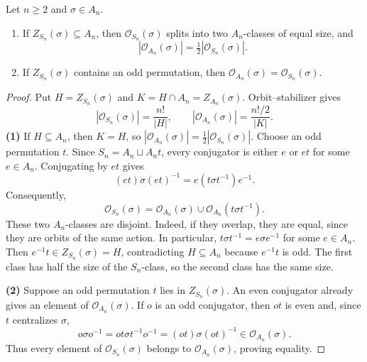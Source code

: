 \documentclass[reqno,11pt]{amsart}
\begin{document}
\begin{proposition}\label{prop:splitting}
Let $n\geq2$ and $\sigma\in A_n$.
\begin{enumerate}[label=\textbf{(\arabic*)}]
  \item If $Z_{S_n}(\sigma)\subseteq A_n$, then
  $\mathcal{O}_{S_n}(\sigma)$ splits into two $A_n$-classes of equal size, and
  \[
    |\mathcal{O}_{A_n}(\sigma)|=\tfrac12|\mathcal{O}_{S_n}(\sigma)|.
  \]
  \item If $Z_{S_n}(\sigma)$ contains an odd permutation, then
  $\mathcal{O}_{A_n}(\sigma)=\mathcal{O}_{S_n}(\sigma)$.
\end{enumerate}
\end{proposition}
\begin{proof}
Put $H=Z_{S_n}(\sigma)$ and $K=H\cap A_n=Z_{A_n}(\sigma)$.
Orbit--stabilizer gives
\[
  |\mathcal{O}_{S_n}(\sigma)|=\frac{n!}{|H|},\qquad
  |\mathcal{O}_{A_n}(\sigma)|=\frac{n!/2}{|K|}.
\]
\textbf{(1)} If $H\subseteq A_n$, then $K=H$, so
$|\mathcal{O}_{A_n}(\sigma)|=\tfrac12|\mathcal{O}_{S_n}(\sigma)|$.
Choose an odd permutation $t$. Since $S_n=A_n\sqcup A_nt$, every
conjugator is either $e$ or $et$ for some $e\in A_n$. Conjugating by
$et$ gives
\[
  (et)\sigma(et)^{-1}=e(t\sigma t^{-1})e^{-1}.
\]
Consequently,
\[
  \mathcal{O}_{S_n}(\sigma)
  =\mathcal{O}_{A_n}(\sigma)\cup
    \mathcal{O}_{A_n}(t\sigma t^{-1}).
\]
These two $A_n$-classes are disjoint. Indeed, if they overlap, they
are equal, since they are orbits of the same action. In particular,
$t\sigma t^{-1}=e\sigma e^{-1}$ for some $e\in A_n$. Then
$e^{-1}t\in Z_{S_n}(\sigma)=H$, contradicting $H\subseteq A_n$
because $e^{-1}t$ is odd. The first class has half the size of the
$S_n$-class, so the second class has the same size.

\textbf{(2)} Suppose an odd permutation $t$ lies in $Z_{S_n}(\sigma)$.
An even conjugator already gives an element of
$\mathcal{O}_{A_n}(\sigma)$. If $o$ is an odd conjugator, then $ot$
is even and, since $t$ centralizes $\sigma$,
\[
  o\sigma o^{-1}
  =ot\sigma t^{-1}o^{-1}
  =(ot)\sigma(ot)^{-1}\in\mathcal{O}_{A_n}(\sigma).
\]
Thus every element of $\mathcal{O}_{S_n}(\sigma)$ belongs to
$\mathcal{O}_{A_n}(\sigma)$, proving equality.
\end{proof}
\end{document}
